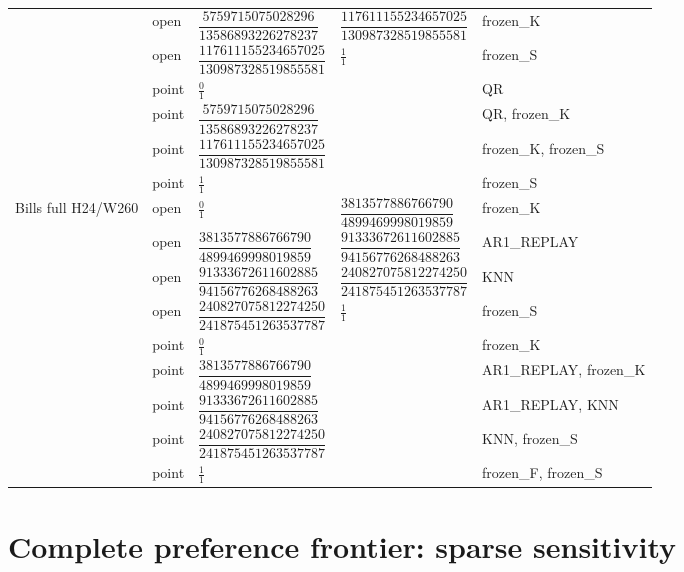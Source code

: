 \documentclass[11pt,a4paper]{article}
\begin{document}
\begin{longtable}{p{28mm}p{10mm}p{39mm}p{39mm}p{28mm}}
 & open & \(\dfrac{5759715075028296}{13586893226278237}\) & \(\dfrac{117611155234657025}{130987328519855581}\) & frozen\_K \\
 & open & \(\dfrac{117611155234657025}{130987328519855581}\) & \(\frac{1}{1}\) & frozen\_S \\
 & point & \(\frac{0}{1}\) &  & QR \\
 & point & \(\dfrac{5759715075028296}{13586893226278237}\) &  & QR, frozen\_K \\
 & point & \(\dfrac{117611155234657025}{130987328519855581}\) &  & frozen\_K, frozen\_S \\
 & point & \(\frac{1}{1}\) &  & frozen\_S \\
Bills full H24/W260 & open & \(\frac{0}{1}\) & \(\dfrac{3813577886766790}{4899469998019859}\) & frozen\_K \\
 & open & \(\dfrac{3813577886766790}{4899469998019859}\) & \(\dfrac{91333672611602885}{94156776268488263}\) & AR1\_REPLAY \\
 & open & \(\dfrac{91333672611602885}{94156776268488263}\) & \(\dfrac{240827075812274250}{241875451263537787}\) & KNN \\
 & open & \(\dfrac{240827075812274250}{241875451263537787}\) & \(\frac{1}{1}\) & frozen\_S \\
 & point & \(\frac{0}{1}\) &  & frozen\_K \\
 & point & \(\dfrac{3813577886766790}{4899469998019859}\) &  & AR1\_REPLAY, frozen\_K \\
 & point & \(\dfrac{91333672611602885}{94156776268488263}\) &  & AR1\_REPLAY, KNN \\
 & point & \(\dfrac{240827075812274250}{241875451263537787}\) &  & KNN, frozen\_S \\
 & point & \(\frac{1}{1}\) &  & frozen\_F, frozen\_S \\
\end{longtable}
\endgroup



\section{Complete preference frontier: sparse sensitivity}\label{sup:frontier-8}
\end{document}
